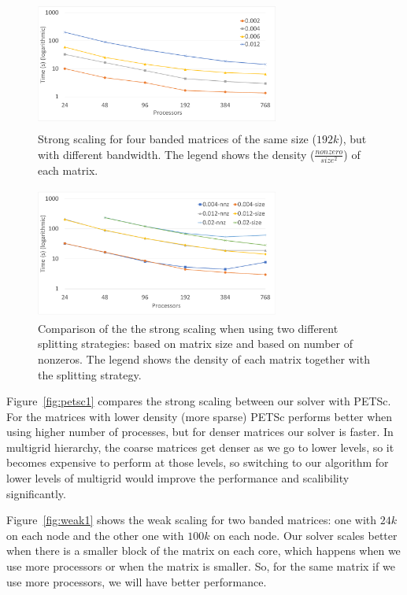 \begin{figure}[tbh]
    \centering
    \includegraphics[width=8cm,height=4.3cm]{./figures/strong2.pdf}
    \caption{Strong scaling for four banded matrices of the same size ($192k$), but with different bandwidth. The legend shows the density ($\frac{nonzero}{size^2}$) of each matrix.}
    \label{fig:strong2}
    \Description{}
\end{figure}

\begin{figure}[tbh]
    \centering
    \includegraphics[width=8cm,height=4.3cm]{./figures/strong_size_vs_nnz2.pdf}
    \caption{Comparison of the the strong scaling when using two different splitting strategies: based on matrix size and based on number of nonzeros. The legend shows the density of each matrix together with the splitting strategy.}
    \label{fig:strongvs}
    \Description{}
\end{figure}

Figure~\ref{fig:petsc1} compares the strong scaling between our solver with PETSc. For the matrices with lower density (more sparse) PETSc performs better when using higher number of processes, but for denser matrices our solver is faster. In multigrid hierarchy, the coarse matrices get denser as we go to lower levels, so it becomes expensive to perform \mm at those levels, so switching to our algorithm for lower levels of multigrid would improve the performance and scalibility significantly.

Figure~\ref{fig:weak1} shows the weak scaling for two banded matrices: one with $24k$ on each node and the other one with $100k$ on each node. Our solver scales better when there is a smaller block of the matrix on each core, which happens when we use more processors or when the matrix is smaller. So, for the same matrix if we use more processors, we will have better performance.

